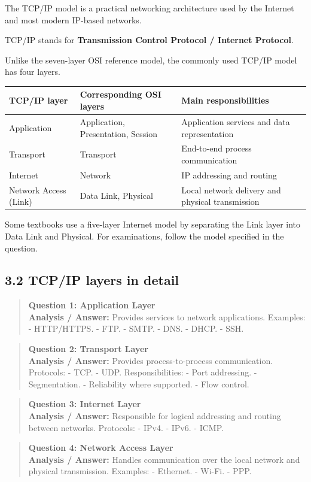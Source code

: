 The TCP/IP model is a practical networking architecture used by the Internet and most modern IP-based networks.

TCP/IP stands for \textbf{Transmission Control Protocol / Internet Protocol}.

Unlike the seven-layer OSI reference model, the commonly used TCP/IP model has four layers.

\begin{table}[htbp]
\centering
\begin{tabularx}{\textwidth}{p{4.2cm} X X}
\toprule
\textbf{TCP/IP layer} & \textbf{Corresponding OSI layers} & \textbf{Main responsibilities} \\
\midrule
Application & Application, Presentation, Session & Application services and data representation \\
Transport & Transport & End-to-end process communication \\
Internet & Network & IP addressing and routing \\
Network Access (Link) & Data Link, Physical & Local network delivery and physical transmission \\
\bottomrule
\end{tabularx}
\end{table}

Some textbooks use a five-layer Internet model by separating the Link layer into Data Link and Physical. For examinations, follow the model specified in the question.

\subsection{3.2 TCP/IP layers in detail}

\begin{quote}
\textbf{Question 1: Application Layer}\\[4pt]
\vspace{4pt}
\textbf{Analysis / Answer:} Provides services to network applications. Examples: - HTTP/HTTPS. - FTP. - SMTP. - DNS. - DHCP. - SSH.
\end{quote}
\begin{quote}
\textbf{Question 2: Transport Layer}\\[4pt]
\vspace{4pt}
\textbf{Analysis / Answer:} Provides process-to-process communication. Protocols: - TCP. - UDP. Responsibilities: - Port addressing. - Segmentation. - Reliability where supported. - Flow control.
\end{quote}
\begin{quote}
\textbf{Question 3: Internet Layer}\\[4pt]
\vspace{4pt}
\textbf{Analysis / Answer:} Responsible for logical addressing and routing between networks. Protocols: - IPv4. - IPv6. - ICMP.
\end{quote}
\begin{quote}
\textbf{Question 4: Network Access Layer}\\[4pt]
\vspace{4pt}
\textbf{Analysis / Answer:} Handles communication over the local network and physical transmission. Examples: - Ethernet. - Wi-Fi. - PPP.
\end{quote}
